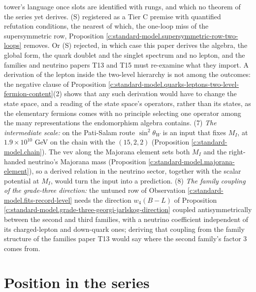 \documentclass[11pt]{article}
\theoremstyle{definition}
\theoremstyle{plain}
\begin{document}
tower's language once slots are identified with rungs, and which no theorem of the series yet derives. (S) registered as a Tier C premise with quantified refutation conditions, the nearest of which, the one-loop miss of the supersymmetric row, Proposition \ref{c:standard-model.supersymmetric-row-two-loops} removes. Or (S) rejected, in which case this paper derives the algebra, the global form, the quark doublet and the singlet spectrum and no lepton, and the families and neutrino papers T13 \cite{ButlerT13} and T15 \cite{ButlerT15} must re-examine what they import. A derivation of the lepton inside the two-level hierarchy is not among the outcomes: the negative clause of Proposition \ref{c:standard-model.quarks-leptons-two-level-fermion-content}(2) shows that any such derivation would have to change the state space, and a reading of the state space's operators, rather than its states, as the elementary fermions comes with no principle selecting one operator among the many representations the endomorphism algebra contains. (7) \emph{The intermediate scale:} on the Pati-Salam route $\sin^{2}\theta_{W}$ is an input that fixes $M_{I}$, at $1.9 \times 10^{10}$ GeV on the chain with the $(15,2,2)$ (Proposition \ref{c:standard-model.chain}). The vev along the Majorana element sets both $M_{I}$ and the right-handed neutrino's Majorana mass (Proposition \ref{c:standard-model.majorana-element}), so a derived relation in the neutrino sector, together with the scalar potential at $M_{I}$, would turn the input into a prediction. (8) \emph{The family coupling of the grade-three direction:} the untuned row of Observation \ref{c:standard-model.fits-record-level} needs the direction $w_{4}(B - L)$ of Proposition \ref{c:standard-model.grade-three-georgi-jarlskog-direction} coupled antisymmetrically between the second and third families, with a neutrino coefficient independent of its charged-lepton and down-quark ones; deriving that coupling from the family structure of the families paper T13 \cite{ButlerT13} would say where the second family's factor $3$ comes from.

\section{Position in the series}
\end{document}
